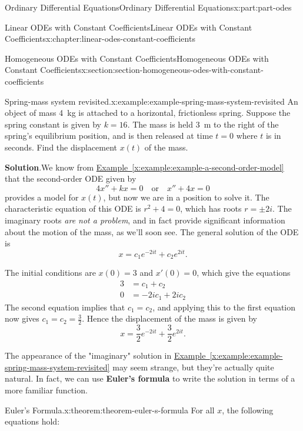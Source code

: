 \documentclass[oneside,10pt,]{book}
\newcommand{\blocktitlefont}{\relax}
\newcommand{\xreffont}{\relax}
\newcommand{\terminology}[1]{\textbf{#1}}
\numberwithin{equation}{part}
\newcommand{\amp}{&}
\begin{document}
\begin{partptx}{Ordinary Differential Equations}{}{Ordinary Differential Equations}{}{}{x:part:part-odes}
\begin{chapterptx}{Linear ODEs with Constant Coefficients}{}{Linear ODEs with Constant Coefficients}{}{}{x:chapter:linear-odes-constant-coefficients}
\begin{sectionptx}{Homogeneous ODEs with Constant Coefficients}{}{Homogeneous ODEs with Constant Coefficients}{}{}{x:section:section-homogeneous-odes-with-constant-coefficients}
\begin{example}{Spring-mass system revisited.}{x:example:example-spring-mass-system-revisited}
An object of mass \SI{4}{\kilo\gram} is attached to a horizontal, frictionless spring. Suppose the spring constant is given by \(k=16\). The mass is held \SI{3}{\meter} to the right of the spring's equilibrium position, and is then released at time \(t=0\) where \(t\) is in seconds. Find the displacement \(x(t)\) of the mass.%
\par\smallskip%
\noindent\textbf{\blocktitlefont Solution}.\hypertarget{g:solution:idp105548780324128}{}\quad{}We know from \hyperref[x:example:example-a-second-order-model]{Example~{\xreffont\ref{x:example:example-a-second-order-model}}} that the second-order ODE given by%
\begin{equation*}
4x'' + kx = 0\quad\text{or}\quad x'' + 4x = 0
\end{equation*}
provides a model for \(x(t)\), but now we are in a position to solve it. The characteristic equation of this ODE is \(r^{2} + 4 = 0\), which has roots \(r=\pm2i\). The imaginary roots \emph{are not a problem}, and in fact provide significant information about the motion of the mass, as we'll soon see. The general solution of the ODE is%
\begin{equation*}
x = c_{1}e^{-2it} + c_{2}e^{2it}.
\end{equation*}
%
\par
The initial conditions are \(x(0) = 3\) and \(x'(0) = 0\), which give the equations%
\begin{align*}
3 \amp = c_{1} + c_{2} \\
0 \amp = -2ic_{1} + 2ic_{2} 
\end{align*}
The second equation implies that \(c_{1} = c_{2}\), and applying this to the first equation now gives \(c_{1} = c_{2} = \frac{3}{2}\). Hence the displacement of the mass is given by%
\begin{equation*}
x = \frac{3}{2}e^{-2it} + \frac{3}{2}e^{2it}.
\end{equation*}
%
\end{example}
The appearance of the "imaginary" solution in \hyperref[x:example:example-spring-mass-system-revisited]{Example~{\xreffont\ref{x:example:example-spring-mass-system-revisited}}} may seem strange, but they're actually quite natural. In fact, we can use \terminology{Euler's formula} to write the solution in terms of a more familiar function.%
\begin{theorem}{Euler's Formula.}{}{x:theorem:theorem-euler-s-formula}%
%
For all \(x\), the following equations hold:%
\begin{align*}

\end{align*}
\end{theorem}
\end{sectionptx}
\end{chapterptx}
\end{partptx}
\end{document}
